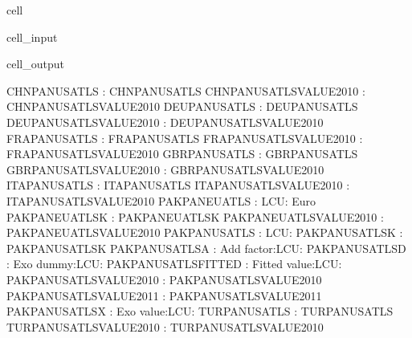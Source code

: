 \documentclass[letterpaper,10pt,english]{jupyterBook}
\begin{document}
\begin{sphinxuseclass}{cell}\begin{sphinxVerbatimInput}

\begin{sphinxuseclass}{cell_input}
\begin{sphinxVerbatim}[commandchars=\\\{\}]
\PYG{p}{[}\PYG{p}{]}
\end{sphinxVerbatim}

\end{sphinxuseclass}\end{sphinxVerbatimInput}
\begin{sphinxVerbatimOutput}

\begin{sphinxuseclass}{cell_output}
\begin{sphinxVerbatim}[commandchars=\\\{\}]
CHNPANUSATLS            : CHNPANUSATLS
CHNPANUSATLS\PYGZus{}VALUE\PYGZus{}2010 : CHNPANUSATLS\PYGZus{}VALUE\PYGZus{}2010
DEUPANUSATLS            : DEUPANUSATLS
DEUPANUSATLS\PYGZus{}VALUE\PYGZus{}2010 : DEUPANUSATLS\PYGZus{}VALUE\PYGZus{}2010
FRAPANUSATLS            : FRAPANUSATLS
FRAPANUSATLS\PYGZus{}VALUE\PYGZus{}2010 : FRAPANUSATLS\PYGZus{}VALUE\PYGZus{}2010
GBRPANUSATLS            : GBRPANUSATLS
GBRPANUSATLS\PYGZus{}VALUE\PYGZus{}2010 : GBRPANUSATLS\PYGZus{}VALUE\PYGZus{}2010
ITAPANUSATLS            : ITAPANUSATLS
ITAPANUSATLS\PYGZus{}VALUE\PYGZus{}2010 : ITAPANUSATLS\PYGZus{}VALUE\PYGZus{}2010
PAKPANEUATLS            : LCU: Euro
PAKPANEUATLSK           : PAKPANEUATLSK
PAKPANEUATLS\PYGZus{}VALUE\PYGZus{}2010 : PAKPANEUATLS\PYGZus{}VALUE\PYGZus{}2010
PAKPANUSATLS            : LCU: \PYGZdl{}
PAKPANUSATLSK           : PAKPANUSATLSK
PAKPANUSATLS\PYGZus{}A          : Add factor:LCU: \PYGZdl{}
PAKPANUSATLS\PYGZus{}D          : Exo dummy:LCU: \PYGZdl{}
PAKPANUSATLS\PYGZus{}FITTED     : Fitted  value:LCU: \PYGZdl{}
PAKPANUSATLS\PYGZus{}VALUE\PYGZus{}2010 : PAKPANUSATLS\PYGZus{}VALUE\PYGZus{}2010
PAKPANUSATLS\PYGZus{}VALUE\PYGZus{}2011 : PAKPANUSATLS\PYGZus{}VALUE\PYGZus{}2011
PAKPANUSATLS\PYGZus{}X          : Exo value:LCU: \PYGZdl{}
TURPANUSATLS            : TURPANUSATLS
TURPANUSATLS\PYGZus{}VALUE\PYGZus{}2010 : TURPANUSATLS\PYGZus{}VALUE\PYGZus{}2010
\end{sphinxVerbatim}

\end{sphinxuseclass}\end{sphinxVerbatimOutput}

\end{sphinxuseclass}
\end{document}
